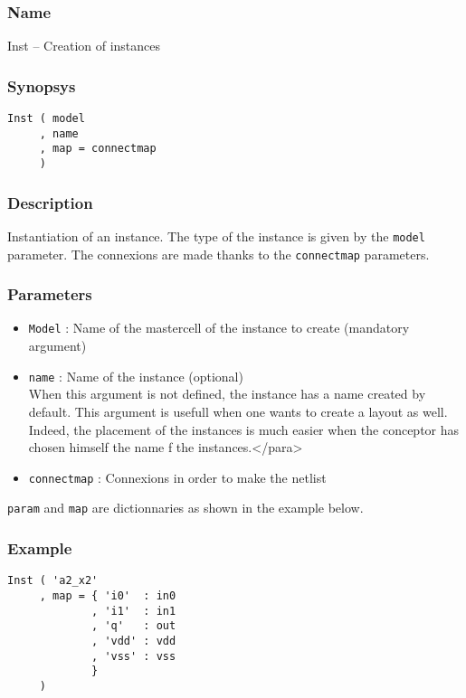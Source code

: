 \subsubsection{Name}

Inst -- Creation of instances

\subsubsection{Synopsys}

\begin{verbatim}
Inst ( model
     , name
     , map = connectmap 
     )
\end{verbatim}

\subsubsection{Description}

Instantiation of an instance. The type of the instance is given by the \verb-model- parameter. The connexions are made thanks to the \verb-connectmap- parameters.

\subsubsection{Parameters}

\begin{itemize}
    \item \verb-Model- : Name of the mastercell of the instance to create (mandatory argument)
    \item \verb-name- : Name of the instance (optional)\\
When this argument is not defined, the instance has a name created by default. This argument is usefull when one wants to create a layout as well. Indeed, the placement of the instances is much easier when the conceptor has chosen himself the name f the instances.</para>
    \item \verb-connectmap- : Connexions in order to make the netlist\\
\end{itemize}
\indent \verb-param- and \verb-map- are dictionnaries as shown in the example below.

\subsubsection{Example}

\begin{verbatim}
Inst ( 'a2_x2'
     , map = { 'i0'  : in0
             , 'i1'  : in1
             , 'q'   : out
             , 'vdd' : vdd
             , 'vss' : vss
             }
     )
\end{verbatim}

